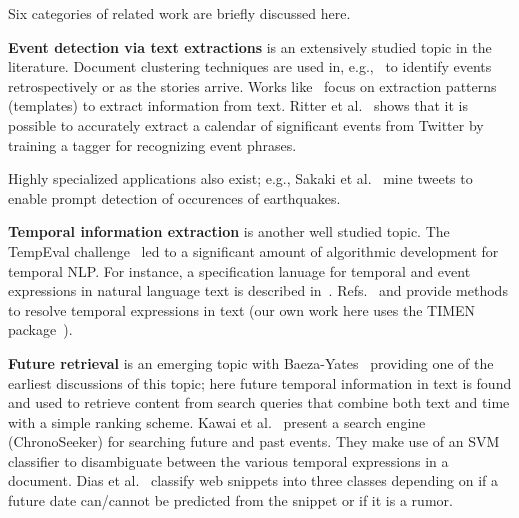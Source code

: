 Six categories of related work 
are briefly discussed here.

{\bf Event detection via text extractions}
is an extensively studied topic in the literature. Document clustering techniques are used 
in, e.g.,~\cite{Allan:2002:TDT, Gabrilovich:2004:NPP, Yang:1998:SRO}
to identify events retrospectively or as the stories arrive.
Works like~\cite{Chambers:2011:TIE, Banko07openinformation, riloff2003learning} focus on
extraction patterns (templates) to extract information from text. Ritter et al.~\cite{Ritter:2012} shows that
it is possible to accurately extract a calendar of significant events from Twitter by training a tagger for recognizing event phrases.
\iffalse 
Sankaranarayanan et al.\cite{Sankaranarayanan:2009:TNT} captures tweet clusters of interest to identify late breaking News from twitter 
\fi
Highly specialized applications
also exist; e.g., Sakaki et al.~\cite{Sakaki:2010:EST} mine tweets to enable prompt detection of occurences of earthquakes.

{\bf Temporal information extraction} is another well studied topic.
The TempEval challenge~\cite{tempeval} led to a significant amount of
algorithmic development for temporal NLP.
For instance, a specification lanuage
for temporal and event expressions in natural language text is described in~\cite{timeml}.
Refs.~\cite{LlorensDGS12} and \cite{tempex} provide methods to resolve temporal expressions in text (our own
work here uses the TIMEN package~\cite{LlorensDGS12}).

{\bf Future retrieval} is an emerging topic with 
Baeza-Yates~\cite{baeza2005searching} providing one of the earliest discussions
of this topic; here future temporal information in text is found and used to retrieve content from search queries that 
combine both text and time with a simple ranking scheme. Kawai et al.~\cite{Kawai:2010:CSE} present a search engine (ChronoSeeker) for searching 
future and past events.
They make use of an SVM classifier to disambiguate between the various temporal expressions in a document.
Dias et al.~\cite{dias2011future} classify web snippets into three classes depending on if a future date can/cannot be predicted 
from the snippet or if it is a rumor.

